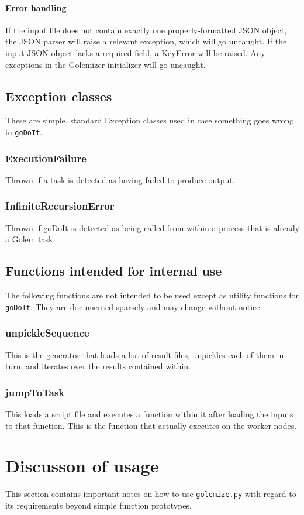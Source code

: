 \documentclass[11pt,ebook,oneside,final]{memoir} %
\begin{document}
\subsubsection*{Error handling}
If the input file does not contain exactly one properly-formatted JSON object, the JSON parser will raise a relevant exception, which will go uncaught. If the input JSON object lacks a required field, a KeyError will be raised. Any exceptions in the Golemizer initializer will go uncaught.

\section{Exception classes}
These are simple, standard Exception classes used in case something goes wrong in \texttt{goDoIt}.
\subsection{ExecutionFailure}
Thrown if a task is detected as having failed to produce output.
\subsection{InfiniteRecursionError}
Thrown if goDoIt is detected as being called from within a process that is already a Golem task.
\section{Functions intended for internal use}
The following functions are not intended to be used except as utility functions for \texttt{goDoIt}. They are documented sparsely and may change without notice.
\subsection{unpickleSequence}
This is the generator that loads a list of result files, unpickles each of them in turn, and iterates over the results contained within.
\subsection{jumpToTask}
This loads a script file and executes a function within it after loading the inputs to that function. This is the function that actually executes on the worker nodes.

\chapter{Discusson of usage}
This section contains important notes on how to use \texttt{golemize.py} with regard to its requirements beyond simple function prototypes.
\end{document}
